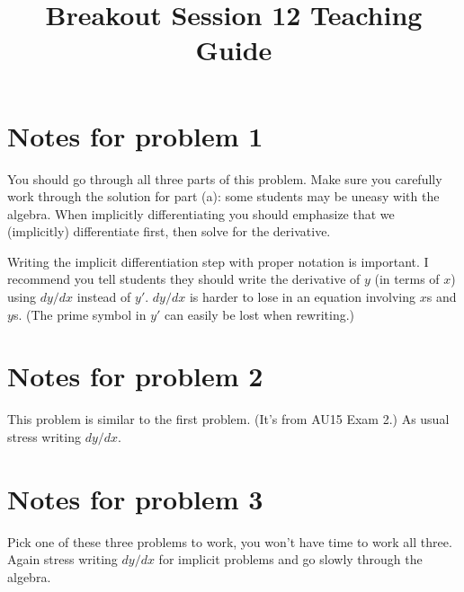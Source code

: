 \documentclass[handout,nooutcomes]{ximera}
\title{Breakout Session 12 Teaching Guide}
\begin{document}
\begin{abstract}
\end{abstract}
\maketitle

\section{Notes for problem 1}
You should go through all three parts of this problem.
Make sure you carefully work through the solution for part (a): some students may be uneasy with the algebra.
When implicitly differentiating you should emphasize that we (implicitly) differentiate first, then solve for the derivative.

Writing the implicit differentiation step with proper notation is important.
I recommend you tell students they should write the derivative of $y$ (in terms of $x$) using $dy/dx$ instead of $y'$.
$dy/dx$ is harder to lose in an equation involving $x$s and $y$s.
(The prime symbol in $y'$ can easily be lost when rewriting.)

\section{Notes for problem 2}
This problem is similar to the first problem.
(It's from AU15 Exam 2.)
As usual stress writing $dy/dx$.

\section{Notes for problem 3}
Pick one of these three problems to work, you won't have time to work all three.
Again stress writing $dy/dx$ for implicit problems and go slowly through the algebra.
\end{document}
